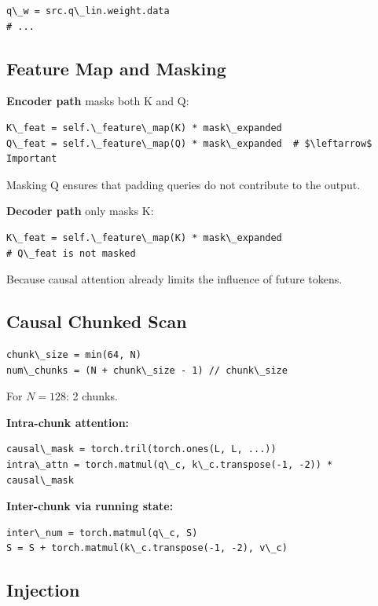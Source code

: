 \begin{lstlisting}
q\_w = src.q\_lin.weight.data
# ...
\end{lstlisting}

\subsection{Feature Map and Masking}

\textbf{Encoder path} masks both K and Q:

\begin{lstlisting}
K\_feat = self.\_feature\_map(K) * mask\_expanded
Q\_feat = self.\_feature\_map(Q) * mask\_expanded  # $\leftarrow$ Important
\end{lstlisting}

Masking Q ensures that padding queries do not contribute to the output.

\textbf{Decoder path} only masks K:

\begin{lstlisting}
K\_feat = self.\_feature\_map(K) * mask\_expanded
# Q\_feat is not masked
\end{lstlisting}

Because causal attention already limits the influence of future tokens.

\subsection{Causal Chunked Scan}

\begin{lstlisting}
chunk\_size = min(64, N)
num\_chunks = (N + chunk\_size - 1) // chunk\_size
\end{lstlisting}

For $N = 128$: 2 chunks.

\textbf{Intra-chunk attention:}

\begin{lstlisting}
causal\_mask = torch.tril(torch.ones(L, L, ...))
intra\_attn = torch.matmul(q\_c, k\_c.transpose(-1, -2)) * causal\_mask
\end{lstlisting}

\textbf{Inter-chunk via running state:}

\begin{lstlisting}
inter\_num = torch.matmul(q\_c, S)
S = S + torch.matmul(k\_c.transpose(-1, -2), v\_c)
\end{lstlisting}

\subsection{Injection}

